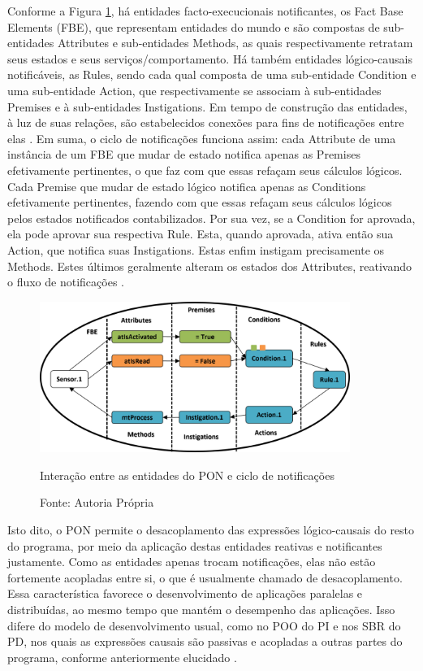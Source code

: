 Conforme a Figura \ref{fig:oshiro_pon}, há entidades facto-execucionais
notificantes, os Fact Base Elements (FBE), que representam entidades do mundo e
são compostas de sub-entidades Attributes e sub-entidades Methods, as quais
respectivamente retratam seus estados e seus serviços/comportamento. Há também
entidades lógico-causais notificáveis, as Rules, sendo cada qual composta de uma
sub-entidade Condition e uma sub-entidade Action, que respectivamente se
associam à sub-entidades Premises e à sub-entidades Instigations. Em tempo de
construção das entidades, à luz de suas relações, são estabelecidos conexões
para fins de notificações entre elas \cite{doc_ronszcka_2019,oshiro_2021}. Em
suma, o ciclo de notificações funciona assim: cada Attribute de uma instância de
um FBE que mudar de estado notifica apenas as Premises efetivamente pertinentes,
o que faz com que essas refaçam seus cálculos lógicos. Cada Premise que mudar de
estado lógico notifica apenas as Conditions efetivamente pertinentes, fazendo
com que essas refaçam seus cálculos lógicos pelos estados notificados
contabilizados. Por sua vez, se a Condition for aprovada, ela pode aprovar sua
respectiva Rule. Esta, quando aprovada, ativa então sua Action, que notifica
suas Instigations. Estas enfim instigam precisamente os Methods. Estes últimos
geralmente alteram os estados dos Attributes, reativando o fluxo de notificações
\cite{doc_ronszcka_2019,oshiro_2021}.

\begin{figure}[!htb]
  \centering
  \includegraphics[width=0.9\textwidth]{../figures/nop_cycle.png}
  \smallskip
  \caption{Interação entre as entidades do PON e ciclo de notificações}
  \caption*{Fonte: Autoria Própria}
  \label{fig:oshiro_pon}
\end{figure}

Isto dito, o PON permite o desacoplamento das expressões lógico-causais do resto
do programa, por meio da aplicação destas entidades reativas e notificantes
justamente. Como as entidades apenas trocam notificações, elas não estão
fortemente acopladas entre si, o que é usualmente chamado de desacoplamento.
Essa característica favorece o desenvolvimento de aplicações paralelas e
distribuídas, ao mesmo tempo que mantém o desempenho das aplicações. Isso difere
do modelo de desenvolvimento usual, como no POO do PI e nos SBR do PD, nos quais
as expressões causais são passivas e acopladas a outras partes do programa,
conforme anteriormente elucidado
\cite{pat_simao_2008,simao_2009,msc_Banaszewski_2009,simao_2012a,doc_ronszcka_2019}.

